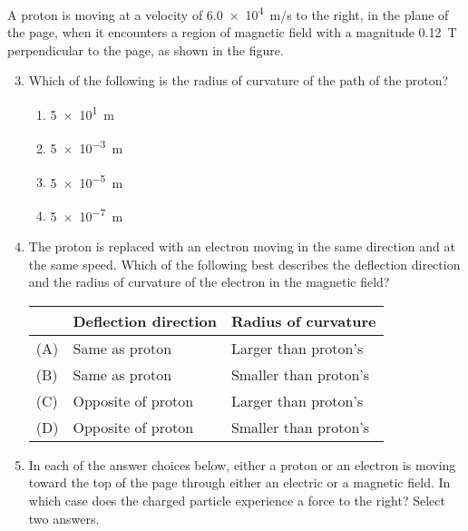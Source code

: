 \documentclass[11pt]{article}
\begin{document}
\begin{multicols}{2}
  \begin{center}
  \end{center}
  A proton is moving at a velocity of \SI{6.0e4}{m/s} to the right, in the
  plane of the page, when it encounters a region of magnetic field with a
  magnitude \SI{0.12}{\tesla} perpendicular to the page, as shown in the
  figure.

  \begin{enumerate}[leftmargin=18pt]
    \setcounter{enumi}{2}
  \item Which of the following is the radius of curvature of the path of the
    proton?
    \begin{enumerate}[noitemsep,topsep=0pt,leftmargin=18pt,label=(\Alph*)]
    \item\SI{5e1}{\metre}
    \item\SI{5e-3}{\metre}
    \item\SI{5e-5}{\metre}
    \item\SI{5e-7}{\metre}
    \end{enumerate}

  \item The proton is replaced with an electron moving in the same direction
    and at the same speed. Which of the following best describes the
    deflection direction and the radius of curvature of the electron in the
    magnetic field?

    \begin{tabular}{lll}
      & \textbf{Deflection direction} & \textbf{Radius of curvature} \\
      \hline
      (A) & Same as proton & Larger than proton's \\
      (B) & Same as proton & Smaller than proton's \\
      (C) & Opposite of proton & Larger than proton's \\
      (D) & Opposite of proton & Smaller than proton's
    \end{tabular}

    \columnbreak

  \item In each of the answer choices below, either a proton or an electron is
    moving toward the top of the page through either an electric or a
    magnetic field. In which case does the charged particle experience a
    force to the right? Select two answers.


\end{enumerate}
\end{multicols}
\end{document}
